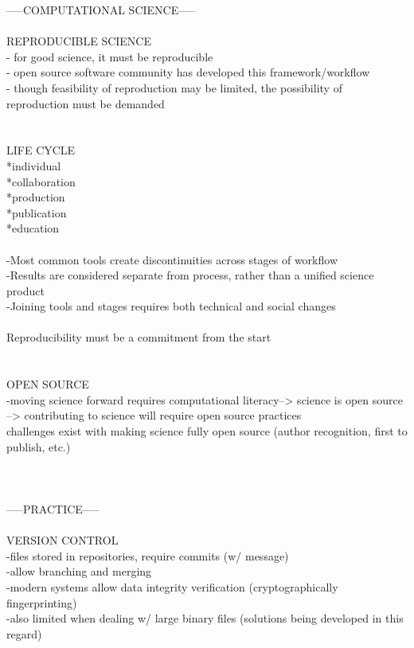 \documentclass{report}
\begin{document}
-----COMPUTATIONAL SCIENCE-----\\
\-\\
REPRODUCIBLE SCIENCE\\
- for good science, it must be reproducible\\
- open source software community has developed this framework/workflow\\
- though feasibility of reproduction may be limited, the possibility of reproduction must be demanded\\
\-\\
\-\\
LIFE CYCLE\\
*individual\\
*collaboration\\
*production\\
*publication\\
*education\\
\-\\
-Most common tools create discontinuities across stages of workflow\\
-Results are considered separate from process, rather than a unified science product\\
-Joining tools and stages requires both technical and social changes\\
\-\\
Reproducibility must be a commitment from the start\\
\-\\
\-\\
OPEN SOURCE\\
-moving science forward requires computational literacy--> science is open source --> contributing to science will require open source practices\\
challenges exist with making science fully open source (author recognition, first to publish, etc.)\\
\-\\
\-\\
\-\\
-----PRACTICE-----\\
\-\\
VERSION CONTROL\\
-files stored in repositories, require commits (w/ message)\\
-allow branching and merging\\
-modern systems allow data integrity verification (cryptographically fingerprinting)\\
-also limited when dealing w/ large binary files (solutions being developed in this regard)\\ 
\end{document}
